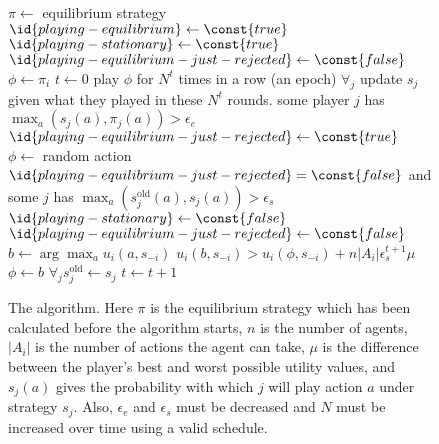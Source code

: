 \begin{SCfigure}
  \begin{minipage}{1.0\linewidth}
    \begin{codebox}
      \li $\pi \gets$ equilibrium strategy
      \li \Repeat
      \li $\id{playing-equilibrium} \gets \const{true}$
      \li $\id{playing-stationary} \gets \const{true}$
      \li $\id{playing-equilibrium-just-rejected} \gets \const{false}$
      \li $\phi \gets \pi_i$
      \li $t \gets 0$
      \li \While {}
      \li \Do play $\phi$ for $N^t$ times in a row (an epoch)
      \li     $\forall_j$ update $s_j$ given what they played in these
      $N^t$ rounds.
      \li     \If {}
      \li     \Then  \If some player $j$ has $\max_a(s_j(a),\pi_j(a)) >
      \epsilon_e$
      \li       \Then
                  $\id{playing-equilibrium-just-rejected} \gets
                   \const{true}$
      \li         $\phi \gets$ random action
                \End
      \li     \Else 
                 \If $\id{playing-equilibrium-just-rejected} =
                 \const{false}$ 
      \zi             \>and some $j$ has
                 $\max_a(s_j^{\text{old}}(a), s_j(a)) > \epsilon_s$
      \li        \Then $\id{playing-stationary} \gets \const{false}$
                 \End
      \li        $\id{playing-equilibrium-just-rejected} \gets
      \const{false}$
      \li        $b \gets \arg \max_a u_i(a,s_{-i})$
      \li        \If $u_i(b,s_{-i}) > u_i(\phi,s_{-i}) +
      n|A_i|\epsilon_s^{t+1}\mu$
      \li        \Then $\phi \gets b$
                 \End
              \End
      \li     $\forall_j s_j^{\text{old}} \gets s_j$
      \li     $t \gets t + 1$
          \End
      \End
    \end{codebox}
  \end{minipage}
  \caption{The  algorithm. Here $\pi$ is the equilibrium
    strategy which has been calculated before the algorithm starts,
    $n$ is the number of agents, $|A_i|$ is the number of actions the
    agent can take, $\mu$ is the difference between the player's best
    and worst possible utility values, and $s_j(a)$ gives the
    probability with which $j$ will play action $a$ under strategy
    $s_j$. Also, $\epsilon_e$ and $\epsilon_s$ must be decreased and
    $N$ must be increased over time using a valid schedule.}
  \label{fig:awesome}
\end{SCfigure}

